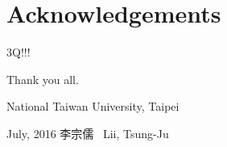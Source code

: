 
\chapter{Acknowledgements}

3Q!!!

\begin{comment}
I should like to thank Prof. Yu-Fang Chen and Prof. Bow-Yaw Wang at Formal
Methods Laboratory in Academia Sinica.
Your guidance and instructions helped me gradually develop the whole framework
since I was a full-time research assistant in FM Lab.
Your solid training and teaching also forced me to establish my knowledge of
Software Verification and Formal Methods.
In particular, the opportunity and the experience you gave me to attend
international conferences surely is very enlightening though quite frightening.
In addition, I am specially grateful to and surprised by the assistance from
Dr. Ming-Hsien Tsai on the implementation.
Your efficiency and proficiency on software programming skills are simply
remarkable and incomparable.
Without your assistance, I am sure I cannot finish the implementation on my own,
let alone participating the competition.

I also learned a lot and pretty enjoyed my life in Software Testing Laboratory
in National Taiwan University.
Prof. Farn Wang is a great role model as a academic researcher.
His ambition on building an industrial strength software testing tool is
respectable.
The laboratory members and assistants are just adorable.
You guys inspired me in a unique way.
Even when we were both struggling for homeworks, reports, exams, and finally
the graduation, you guys still found many ways to relax and relief the tension
among the whole lab.
"Work Hard, Play Hard" is the spirit I learned from you.
You guys rock.

Finally, my appreciation to my parents and siblings is beyond words.
Thanks for your constant nagging on me about my physically and mentally
unhealthy lifestyle as well as trying to stop my 26-year-without-girlfriend
achievement.
Your concerns and considerations kept reminding me that,
even if I might fail so hard and be so frustrated, I still can go home,
where I can relax and recover until the next challenge comes.

\end{comment}

\vspace{8mm}

\noindent
Thank you all.

\vspace{8mm}

\noindent
National Taiwan University, Taipei

\noindent
July, 2016 \hfill 李宗儒 \ Lii, Tsung-Ju

